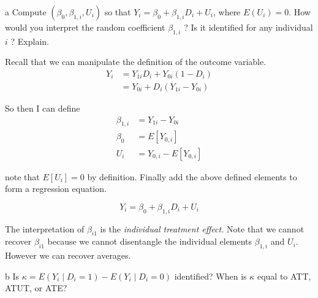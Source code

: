 \documentclass{article}
\begin{document}
\begin{problem}{a}
 Compute $\left(\beta_{0}, \beta_{1, i}, U_{i}\right)$ so that $Y_{i}=\beta_{0}+\beta_{1, i} D_{i}+U_{i}$, where $E\left(U_{i}\right)=0$. How would you interpret the random coefficient $\beta_{1, i}$ ? Is it identified for any individual $i$ ? Explain. 
\end{problem}
\begin{solution}
Recall that we can manipulate the definition of the outcome variable.
\begin{align*}
Y_{i} & =Y_{1i}D_{i}+Y_{0i}\left(1-D_{i}\right)\\
 & =Y_{0i}+D_{i}\left(Y_{1i}-Y_{0i}\right)
\end{align*}

So then I can define
\begin{align*}
\beta_{1,i} & =Y_{1i}-Y_{0i}\\
\beta_{0} & =E\left[Y_{0,i}\right]\\
U_{i} & =Y_{0,i}-E\left[Y_{0,i}\right]
\end{align*}

note that $E\left[U_{i}\right]=0$ by definition. Finally add the above defined elements to form a regression equation.

\[
\ensuremath{Y_{i}=\beta_{0}+\beta_{1,i}D_{i}+U_{i}}
\]

The interpretation of $\beta_{i1}$ is the \emph{individual treatment
effect. }Note that we cannot recover $\beta_{i1}$ because we cannot
disentangle the individual elements $\beta_{1,i}$ and $U_{i}$. However
we can recover averages. 
\end{solution}
\begin{problem}{b}
Is $\kappa=E\left(Y_{i} \mid D_{i}=1\right)-E\left(Y_{i} \mid D_{i}=0\right)$ identified? When is $\kappa$ equal to ATT, ATUT, or ATE? \end{problem}
\end{document}
